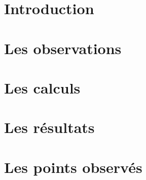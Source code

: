 \documentclass[french]{report}
\begin{document}


%

%

%

%

\tableofcontents


\chapter{Introduction}


\chapter{Les observations}


\chapter{Les calculs}


\chapter{Les résultats}


%

\appendix
\chapter{Les points observés}
%
%


\listoffigures
\end{document}
